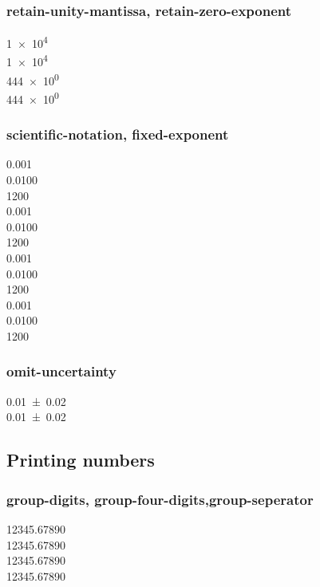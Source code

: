 \documentclass{article}
\begin{document}
\subsubsection{retain-unity-mantissa, retain-zero-exponent}
\num{1e4} \\
\num[retain-unity-mantissa = false]{1e4} \\
\num{444e0} \\
\num[retain-zero-exponent = true]{444e0}\\

\subsubsection{scientific-notation, fixed-exponent}
{
\num{0.001}\\
\num{0.0100} \\
\num{1200}\\
%
\num{0.001}\\
\num{0.0100} \\
\num{1200}\\
%
\num{0.001}\\
\num{0.0100} \\
\num{1200}\\
%
\num{0.001}\\
\num{0.0100} \\
\num{1200}\\
}

\subsubsection{omit-uncertainty}
\num{0.01(2)} \\
\num[omit-uncertainty]{0.01(2)}\\

\subsection{Printing numbers}
\subsubsection{group-digits, group-four-digits,group-seperator}
\num{12345.67890}\\
\num[group-digits= false]{12345.67890}\\
\num[group-digits= decimal]{12345.67890} \\
\num[group-digits= integer]{12345.67890}\\
\end{document}
